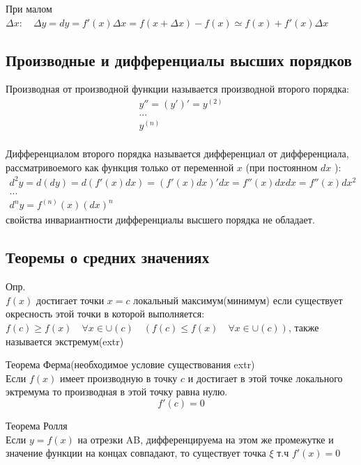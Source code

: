 \documentclass[a4paper, 12pt]{article}
\begin{document}
При малом $ \Delta x: \quad \Delta y = dy = f'(x)\Delta x = f(x + \Delta x) - f(x) \simeq f(x) + f'(x)\Delta x $ \\

\subsection{Производные и дифференциалы высших порядков}
Производная от производной функции называется производной второго порядка:\\
\begin{align*}
   y'' = (y')' = y^{(2)}  \\
 ...\\
   y^{(n)} \\
\end{align*}


Дифференциалом второго порядка называется дифференциал от дифференциала, рассматривоемого как функция только от переменной $ x $ (при постоянном $ dx $ ):\\
\begin{align*}
       d^2y = d(dy) = d(f'(x)dx)=(f'(x)dx)'dx=f''(x) dxdx=f''(x) dx^2 \\
      ...\\
       d^ny = f^{(n)}(x) (dx)^{n} 
    \end{align*}
свойства инвариантности дифференциалы высшего порядка не обладает.\\

\subsection{Теоремы о средних значениях}

Опр.\\
$ f(x) $ достигает точки $ x = c $ локальный максимум(минимум) если существует окресность этой точки в которой выполняется: $ f(c) \geq f(x) \quad \forall x \in \cup(c)\quad (f(c) \leq f(x) \quad \forall x \in \cup(c))$, также называется экстремум(extr)\\
\newpage
\begin{mdframed}[backgroundcolor=blue!20] 
       Теорема Ферма(необходимое условие существования extr)\\
       Если $ f(x) $ имеет производную в точку $ c $ и достигает в этой точке локального эктремума то производная в этой точку равна нулю.\[
         f'(c) = 0
       \] 

       Теорема Ролля\\
       Если $ y = f(x) $ на отрезки AB, дифференцируема на этом же промежутке и значение функции на концах совпадают, то существует точка $ \xi  $ т.ч $ f'(x) = 0 $   


    \end{mdframed}
\end{document}
